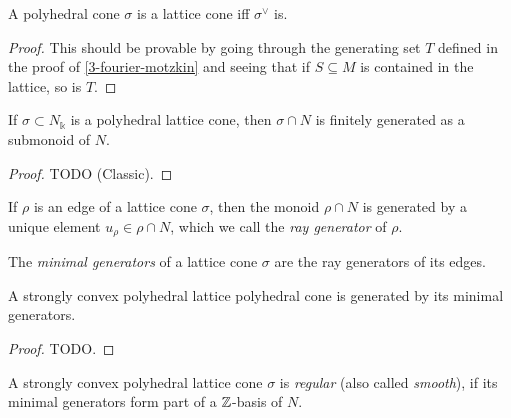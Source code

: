 \begin{lemma}
  \label{3-dual-lattice-cone}
  A polyhedral cone \( \sigma \) is a lattice cone iff \(
  \sigma^{\vee} \) is.
\end{lemma}
\begin{proof}
  \uses{}
  This should be provable by going through the generating set \( T \)
  defined in the proof of \ref{3-fourier-motzkin} and seeing that if
  \( S \subseteq M \) is contained in the lattice, so is \( T \).
\end{proof}

\begin{proposition}
  \label{3-gordan-lemma}
  If \( \sigma \subset N_{\Bbbk} \) is a polyhedral lattice cone, then
  \( \sigma \cap N \) is finitely generated as a submonoid of \( N \).
\end{proposition}
\begin{proof}
  \uses{}
  TODO (Classic).
\end{proof}

\begin{definition}
  \label{3-ray-gen}
  If \( \rho \) is an edge of a lattice cone $\sigma$, then the
  monoid $\rho \cap N$ is generated by a unique element $u_\rho \in
  \rho \cap N$, which we call the \emph{ray generator} of $\rho$.
\end{definition}


\begin{definition}
  \label{3-min-gen}
  The \emph{minimal generators} of a lattice cone $\sigma$ are the
  ray generators of its edges.
\end{definition}


\begin{lemma}
  \label{3-min-gen-generate}
  A strongly convex polyhedral lattice polyhedral cone is generated by
  its minimal generators.
\end{lemma}
\begin{proof}
  \uses{}
  TODO.
\end{proof}


\begin{definition}
  \label{3-regular-cone}
  A strongly convex polyhedral lattice cone $\sigma$ is \emph{regular}
  (also called \emph{smooth}), if its minimal generators form part of
  a ${\mathbb Z}$-basis of $N$.
\end{definition}


